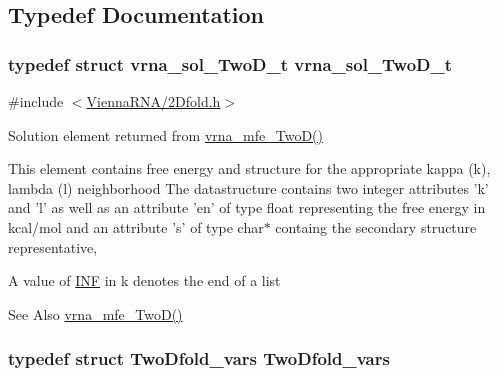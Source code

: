 \subsection{Typedef Documentation}
\hypertarget{group__kl__neighborhood__mfe_ga6a81a58268d250309712549a3fa0aab2}{
\subsubsection[{vrna\-\_\-sol\-\_\-\-Two\-D\-\_\-t}]{\setlength{\rightskip}{0pt plus 5cm}typedef struct {\bf vrna\-\_\-sol\-\_\-\-Two\-D\-\_\-t}  {\bf vrna\-\_\-sol\-\_\-\-Two\-D\-\_\-t}}}\label{group__kl__neighborhood__mfe_ga6a81a58268d250309712549a3fa0aab2}


{\ttfamily \#include $<$\hyperlink{2Dfold_8h}{Vienna\-R\-N\-A/2\-Dfold.\-h}$>$}



Solution element returned from \hyperlink{group__kl__neighborhood__mfe_ga243c288b463147352829df04de6a2f77}{vrna\-\_\-mfe\-\_\-\-Two\-D()} 

This element contains free energy and structure for the appropriate kappa (k), lambda (l) neighborhood The datastructure contains two integer attributes 'k' and 'l' as well as an attribute 'en' of type float representing the free energy in kcal/mol and an attribute 's' of type char$\ast$ containg the secondary structure representative,

A value of \hyperlink{energy__const_8h_a12c2040f25d8e3a7b9e1c2024c618cb6}{I\-N\-F} in k denotes the end of a list

\begin{DoxySeeAlso}{See Also}
\hyperlink{group__kl__neighborhood__mfe_ga243c288b463147352829df04de6a2f77}{vrna\-\_\-mfe\-\_\-\-Two\-D()} 
\end{DoxySeeAlso}
\hypertarget{group__kl__neighborhood__mfe_gaf4f514010a14f9d59d850742b3e96954}{
\subsubsection[{Two\-Dfold\-\_\-vars}]{\setlength{\rightskip}{0pt plus 5cm}typedef struct {\bf Two\-Dfold\-\_\-vars}  {\bf Two\-Dfold\-\_\-vars}}}\label{group__kl__neighborhood__mfe_gaf4f514010a14f9d59d850742b3e96954}


